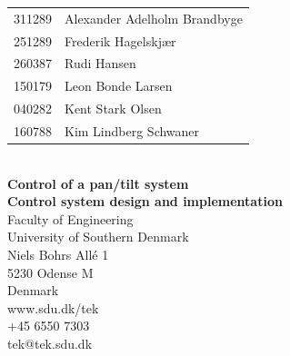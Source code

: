 \begin{titlepage}
\begin{tabular}{@{}l l}
	\textsf{\large{311289}} & \textsf{\large{Alexander Adelholm Brandbyge}}\\
	\textsf{\large{251289}} & \textsf{\large{Frederik Hagelskjær}}\\
	\textsf{\large{260387}} & \textsf{\large{Rudi Hansen}}\\
	\textsf{\large{150179}} & \textsf{\large{Leon Bonde Larsen}}\\
	\textsf{\large{040282}} & \textsf{\large{Kent Stark Olsen}}\\
	\textsf{\large{160788}} & \textsf{\large{Kim Lindberg Schwaner}}
\end{tabular}
\setlength{\extrarowheight}{0pt}
\vspace*{1.5cm}
\\
\textsf{\Huge{\textbf{\textcolor{FrontpageHeadingColor}{Control of a pan/tilt system}}}}
\vspace*{0.5cm}
\\
\textsf{\Large{\textbf{\textcolor{FrontpageHeadingColor}{Control system design and  implementation}}}}
\vfill
\textsf{\\Faculty of Engineering\\
University of Southern Denmark\\
Niels Bohrs Allé 1\\
5230 Odense M\\
Denmark}
\vspace*{10pt}
\\
\textsf{www.sdu.dk/tek\\
+45 6550 7303\\
tek@tek.sdu.dk}
\end{titlepage}%
